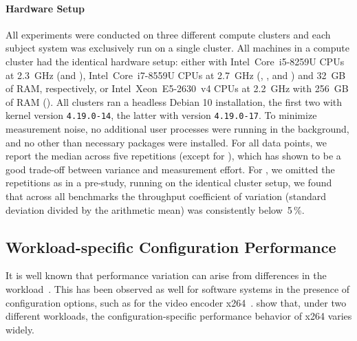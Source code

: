 \paragraph*{Hardware Setup}
All experiments were conducted on three different compute clusters and each subject system was exclusively run on a single cluster. All machines in a compute cluster had the identical hardware setup: either with Intel~Core~i5-8259U CPUs at 2.3~GHz (\jumper and \kanzi),  Intel~Core~i7-8559U CPUs at 2.7~GHz (\dconvert, \batik, and \jadx) and 32~GB of RAM, respectively, or Intel~Xeon~E5-2630~v4 CPUs at 2.2~GHz with 256~GB of RAM (\htwo). All clusters ran a headless Debian 10 installation, the first two with kernel version \mbox{\texttt{4.19.0-14}}, the latter with version \mbox{\texttt{4.19.0-17}}. 
To minimize measurement noise, no additional user processes were running in the background, and no other than necessary packages were installed.	For all data points, we report the median across five repetitions (except for \htwo), which has shown to be a good trade-off between variance and measurement effort. {\color{red}For \htwo, we omitted the repetitions as in a pre-study, running on the identical cluster setup, we found that across all benchmarks the throughput coefficient of variation (standard deviation divided by the arithmetic mean) was consistently below~5\,\%. }


\subsection{Workload-specific Configuration Performance}\label{sec:rq1}
It is well known that performance variation can arise from differences in the workload~\cite{benchmarking_book}. 
This has been observed as well for software systems in the presence of configuration options, such as for the video encoder x264~\cite{alves_sampling_2020}. \citeauthor{alves_sampling_2020} show that, under two different workloads, the configuration-specific performance behavior of x264 varies widely. 


